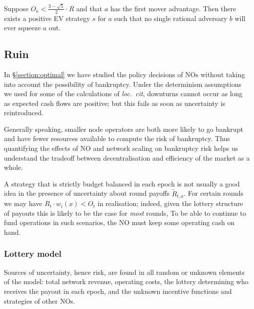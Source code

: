 \begin{proposition}[No squeezing]
  \label{thm:no-squeeze}
  
  Suppose $O_a< \frac{3-\sqrt {5}}{2} \cdot R$ and that $a$ has the first mover advantage.
  Then there exists a positive EV strategy $s$ for $a$ such that no single rational adversary $b$ will ever squeeze $a$ out.

\end{proposition}



\subsection{Ruin}
\label{section:risk}

In \S\ref{section:optimal} we have studied the policy decisions of NOs without taking into account the possibility of bankruptcy.
%
Under the determinism assumptions we used for some of the calculations of \emph{loc.~cit}, downturns cannot occur as long as expected cash flows are positive; but this fails as soon as uncertainty is reintroduced.

Generally speaking, smaller node operators are both more likely to go bankrupt and have fewer resources available to compute the risk of bankruptcy.
%
Thus quantifying the effects of NO and network scaling on bankruptcy risk helps us understand the tradeoff between decentralisation and efficiency of the market as a whole.


\begin{example}

  A strategy that is strictly budget balanced in each epoch is not usually a good idea in the presence of uncertainty about round payoffs $\tilde{R}_{t,a}$.
  For certain rounds we may have $R_t\cdot w_i(x) < O_t$ in realisation; indeed, given the lottery structure of payouts this is likely to be the case for \emph{most} rounds,
  To be able to continue to fund operations in such scenarios, the NO must keep some operating cash on hand.

\end{example}

\subsubsection{Lottery model}

Sources of uncertainty, hence risk, are found in all random or unknown elements of the model: total network revenue, operating costs, the lottery determining who receives the payout in each epoch, and the unknown incentive functions and strategies of other NOs.

